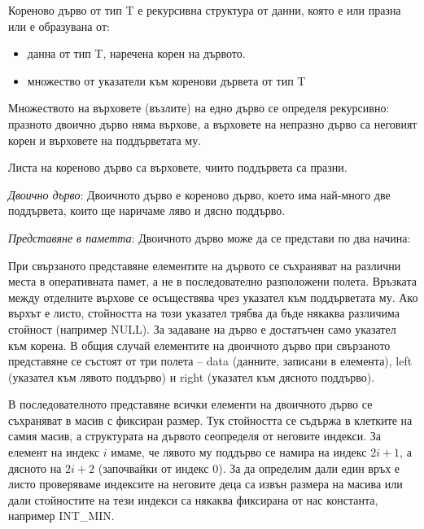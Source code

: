 \documentclass{article}
\renewcommand{\\}{\newline}
\begin{document}
Кореново дърво от тип T е рекурсивна структура от данни, която е или празна или е образувана от:
\begin{itemize}
    \item данна от тип T, наречена корен на дървото.
    \item множество от указатели към коренови дървета от тип T
\end{itemize}

Множеството на върховете (възлите) на едно дърво се определя рекурсивно: празното двоично дърво няма върхове, а върховете на непразно дърво са неговият корен и върховете на поддърветата му.

Листа на кореново дърво са върховете, чиито поддървета са празни.

\textit{Двоично дърво}: Двоичното дърво е кореново дърво, което има най-много две поддървета, които ще наричаме ляво и дясно поддърво.

\textit{Представяне в паметта}:
Двоичното дърво може да се представи по два начина: 

При свързаното представяне елементите на дървото се съхраняват на различни места в оперативната памет, а не в последователно разположени полета. Връзката между отделните върхове се осъществява чрез указател към поддърветата му. Ако върхът е листо, стойността на този указател трябва да бъде някаква различима стойност (например NULL). За задаване на дърво е достатъчен само указател към корена. В общия случай елементите на двоичното дърво при свързаното представяне се състоят от три полета – data (данните, записани в елемента), left (указател към лявото поддърво) и right (указател към дясното поддърво).

В последователното представяне всички елементи на двоичното дърво се съхраняват в масив с фиксиран размер. Тук стойността се съдържа в клетките на самия масив, а структурата на дървото сеопределя от неговите индекси. За елемент на индекс \(i\) имаме, че лявото му поддърво се намира на индекс \(2i+1\), а дясното на \(2i + 2\) (започвайки от индекс 0). За да определим дали един връх е листо проверяваме индексите на неговите деца са извън размера на масива или дали стойностите на тези индекси са някаква фиксирана от нас константа, например INT\_MIN.
\end{document}
